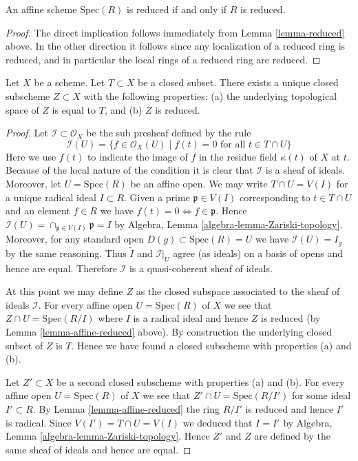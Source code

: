 \begin{lemma}
\label{lemma-affine-reduced}
An affine scheme $\text{Spec}(R)$ is reduced
if and only if $R$ is reduced.
\end{lemma}

\begin{proof}
The direct implication follows immediately from
Lemma \ref{lemma-reduced} above.
In the other direction it follows since any localization of
a reduced ring is reduced, and in particular the local rings
of a reduced ring are reduced.
\end{proof}

\begin{lemma}
\label{lemma-reduced-closed-subscheme}
Let $X$ be a scheme. Let $T \subset X$ be a closed subset.
There exists a unique closed subscheme $Z \subset X$ with
the following properties: (a) the underlying topological
space of $Z$ is equal to $T$, and (b) $Z$ is reduced.
\end{lemma}

\begin{proof}
Let $\mathcal{I} \subset \mathcal{O}_X$ be the sub presheaf
defined by the rule
$$
\mathcal{I}(U) = \{f \in \mathcal{O}_X(U) \mid
f(t) = 0\text{ for all }t \in T\cap U\}
$$
Here we use $f(t)$ to indicate the image of
$f$ in the residue field $\kappa(t)$ of $X$ at $t$.
Because of the local nature of the condition it is
clear that $\mathcal{I}$ is a sheaf of ideals. Moreover,
let $U = \text{Spec}(R)$ be an affine open. 
We may write $T \cap U = V(I)$ for a unique radical
ideal $I \subset R$. Given a prime $\mathfrak p \in V(I)$
corresponding to $t \in T \cap U$ and an element $f \in R$ we have
$f(t) = 0 \Leftrightarrow f \in \mathfrak p$.
Hence $\mathcal{I}(U) = \cap_{\mathfrak p \in V(I)} \mathfrak p
= I$ by Algebra, Lemma \ref{algebra-lemma-Zariski-topology}.
Moreover, for any standard open $D(g) \subset \text{Spec}(R) = U$
we have $\mathcal{I}(U) = I_g$ by the same reasoning.
Thus $\widetilde I$ and $\mathcal{I}|_U$ agree (as ideals)
on a basis of opens and hence are equal. Therefore
$\mathcal{I}$ is a quasi-coherent sheaf of ideals.

\medskip\noindent
At this point we may define $Z$ as the closed subspace
associated to the sheaf of ideals $\mathcal{I}$. For every
affine open $U = \text{Spec}(R)$ of $X$ we see that
$Z \cap U = \text{Spec}(R/I)$ where $I$ is a radical ideal and
hence $Z$ is reduced (by Lemma \ref{lemma-affine-reduced} above).
By construction the underlying closed subset of $Z$ is $T$.
Hence we have found a closed subscheme with properties (a) and (b).

\medskip\noindent
Let $Z' \subset X$ be a second closed subscheme with properties (a) and (b).
For every affine open $U = \text{Spec}(R)$ of $X$ we see that
$Z' \cap U = \text{Spec}(R/I')$ for some ideal $I' \subset R$.
By Lemma \ref{lemma-affine-reduced} the ring $R/I'$ is
reduced and hence $I'$ is radical. Since $V(I') = T \cap U = V(I)$
we deduced that $I = I'$ by
Algebra, Lemma \ref{algebra-lemma-Zariski-topology}.
Hence $Z'$ and $Z$ are defined by the same sheaf of ideals
and hence are equal.
\end{proof}


